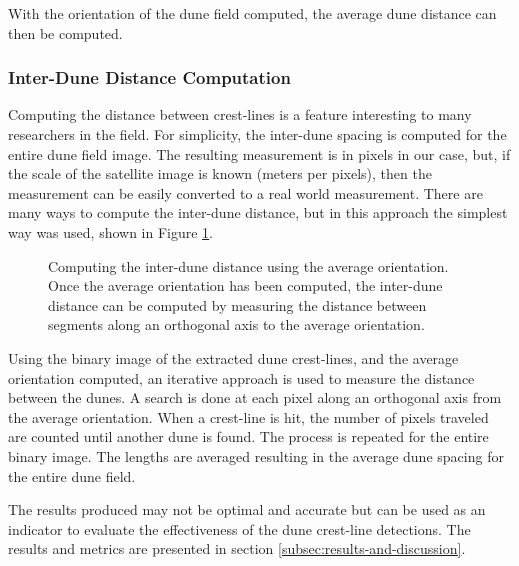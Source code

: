 With the orientation of the dune field computed, the average dune distance can then be computed.

\subsubsection{Inter-Dune Distance Computation}
Computing the distance between crest-lines is a feature interesting to many researchers in the field. For simplicity, the inter-dune spacing is computed for the entire dune field image. The resulting measurement is in pixels in our case, but, if the scale of the satellite image is known (meters per pixels), then the measurement can be easily converted to a real world measurement. There are many ways to compute the inter-dune distance, but in this approach the simplest way was used, shown in Figure \ref{fig:inter-dune-distance-computation}. 

\begin{figure}
	\centering
	\caption{ Computing the inter-dune distance using the average orientation. Once the average orientation has been computed, the inter-dune distance can be computed by measuring the distance between segments along an orthogonal axis to the average orientation.}
	\label{fig:inter-dune-distance-computation}
\end{figure}

Using the binary image of the extracted dune crest-lines, and the average orientation computed, an iterative approach is used to measure the distance between the dunes. A search is done at each pixel along an orthogonal axis from the average orientation. When a crest-line is hit, the number of pixels traveled are counted until another dune is found. The process is repeated for the entire binary image. The lengths are averaged resulting in the average dune spacing for the entire dune field.

The results produced may not be optimal and accurate but can be used as an indicator to evaluate the effectiveness of the dune crest-line detections. The results and metrics are presented in section \ref{subsec:results-and-discussion}.










